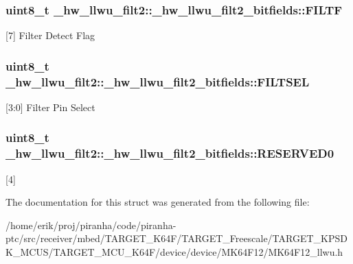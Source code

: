 \subsubsection[{\texorpdfstring{F\+I\+L\+TF}{FILTF}}]{\setlength{\rightskip}{0pt plus 5cm}uint8\+\_\+t \+\_\+hw\+\_\+llwu\+\_\+filt2\+::\+\_\+hw\+\_\+llwu\+\_\+filt2\+\_\+bitfields\+::\+F\+I\+L\+TF}\hypertarget{struct__hw__llwu__filt2_1_1__hw__llwu__filt2__bitfields_ad9d1c360910f9b1018a8cfd38fdf9ec2}{}\label{struct__hw__llwu__filt2_1_1__hw__llwu__filt2__bitfields_ad9d1c360910f9b1018a8cfd38fdf9ec2}
\mbox{[}7\mbox{]} Filter Detect Flag 
\subsubsection[{\texorpdfstring{F\+I\+L\+T\+S\+EL}{FILTSEL}}]{\setlength{\rightskip}{0pt plus 5cm}uint8\+\_\+t \+\_\+hw\+\_\+llwu\+\_\+filt2\+::\+\_\+hw\+\_\+llwu\+\_\+filt2\+\_\+bitfields\+::\+F\+I\+L\+T\+S\+EL}\hypertarget{struct__hw__llwu__filt2_1_1__hw__llwu__filt2__bitfields_ad27c71c68f9aa0314dc5ffbc75186556}{}\label{struct__hw__llwu__filt2_1_1__hw__llwu__filt2__bitfields_ad27c71c68f9aa0314dc5ffbc75186556}
\mbox{[}3\+:0\mbox{]} Filter Pin Select 
\subsubsection[{\texorpdfstring{R\+E\+S\+E\+R\+V\+E\+D0}{RESERVED0}}]{\setlength{\rightskip}{0pt plus 5cm}uint8\+\_\+t \+\_\+hw\+\_\+llwu\+\_\+filt2\+::\+\_\+hw\+\_\+llwu\+\_\+filt2\+\_\+bitfields\+::\+R\+E\+S\+E\+R\+V\+E\+D0}\hypertarget{struct__hw__llwu__filt2_1_1__hw__llwu__filt2__bitfields_a6c7bfa78af736cf2f90c09049979378a}{}\label{struct__hw__llwu__filt2_1_1__hw__llwu__filt2__bitfields_a6c7bfa78af736cf2f90c09049979378a}
\mbox{[}4\mbox{]} 

The documentation for this struct was generated from the following file\+:\begin{DoxyCompactItemize}
\item 
/home/erik/proj/piranha/code/piranha-\/ptc/src/receiver/mbed/\+T\+A\+R\+G\+E\+T\+\_\+\+K64\+F/\+T\+A\+R\+G\+E\+T\+\_\+\+Freescale/\+T\+A\+R\+G\+E\+T\+\_\+\+K\+P\+S\+D\+K\+\_\+\+M\+C\+U\+S/\+T\+A\+R\+G\+E\+T\+\_\+\+M\+C\+U\+\_\+\+K64\+F/device/device/\+M\+K64\+F12/M\+K64\+F12\+\_\+llwu.\+h\end{DoxyCompactItemize}
